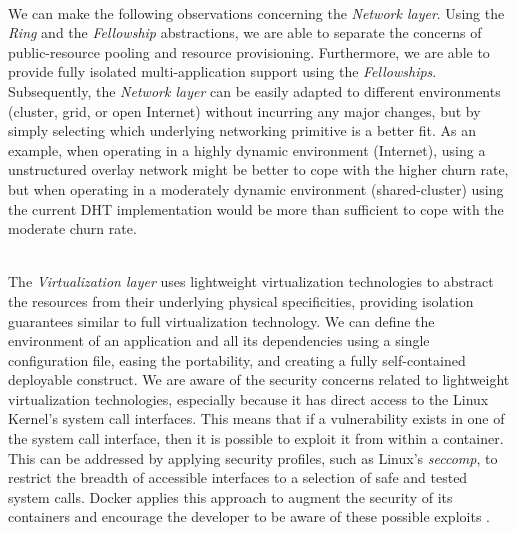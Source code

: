 \documentclass[12pt, titlepage]{uo_temp}
\begin{document}
     \\ We can make the following observations concerning the \emph{Network layer}. Using
     the \emph{Ring} and the \emph{Fellowship} abstractions, we are able to separate the
     concerns of public-resource pooling and resource provisioning. Furthermore, we are
     able to provide fully isolated multi-application support using the
     \emph{Fellowships}. Subsequently, the \emph{Network layer} can be easily adapted to
     different environments (cluster, grid, or open Internet) without incurring any major
     changes, but by simply selecting which underlying networking primitive is a better
     fit. As an example, when operating in a highly dynamic environment (Internet), using
     a unstructured overlay network might be better to cope with the higher churn rate,
     but when operating in a moderately dynamic environment (shared-cluster) using the
     current DHT implementation would be more than sufficient to cope with the moderate
     churn rate.

     \\ The \emph{Virtualization layer} uses lightweight virtualization technologies to
     abstract the resources from their underlying physical specificities, providing
     isolation guarantees similar to full virtualization technology. We can define the
     environment of an application and all its dependencies using a single configuration
     file, easing the portability, and creating a fully self-contained deployable
     construct. We are aware of the security concerns related to lightweight
     virtualization technologies, especially because it has direct access to the Linux
     Kernel's system call interfaces. This means that if a vulnerability exists in one of
     the system call interface, then it is possible to exploit it from within a
     container. This can be addressed by applying security profiles, such as Linux's
     \emph{seccomp}, to restrict the breadth of accessible interfaces to a selection of
     safe and tested system calls. Docker applies this approach to augment the security of
     its containers and encourage the developer to be aware of these possible exploits
     \cite{docker_security}.
     
\end{document}
